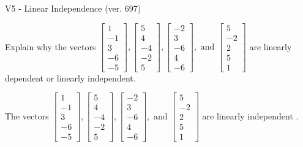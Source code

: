 \begin{exercise}
  \begin{exerciseTitle}V5 - Linear Independence (ver. 697)\end{exerciseTitle}
  \begin{exerciseStatement}
    Explain why the vectors \(\left[\begin{array}{r}
1 \\
-1 \\
3 \\
-6 \\
-5
\end{array}\right] , \left[\begin{array}{r}
5 \\
4 \\
-4 \\
-2 \\
5
\end{array}\right] , \left[\begin{array}{r}
-2 \\
3 \\
-6 \\
4 \\
-6
\end{array}\right] , \text{ and } \left[\begin{array}{r}
5 \\
-2 \\
2 \\
5 \\
1
\end{array}\right]\) are linearly dependent or linearly independent.	


  \end{exerciseStatement}
  \begin{exerciseAnswer}
   The vectors \(\left[\begin{array}{r}
1 \\
-1 \\
3 \\
-6 \\
-5
\end{array}\right] , \left[\begin{array}{r}
5 \\
4 \\
-4 \\
-2 \\
5
\end{array}\right] , \left[\begin{array}{r}
-2 \\
3 \\
-6 \\
4 \\
-6
\end{array}\right] , \text{ and } \left[\begin{array}{r}
5 \\
-2 \\
2 \\
5 \\
1
\end{array}\right]\) are 
  	 linearly independent  .
  


  \end{exerciseAnswer}
\end{exercise}